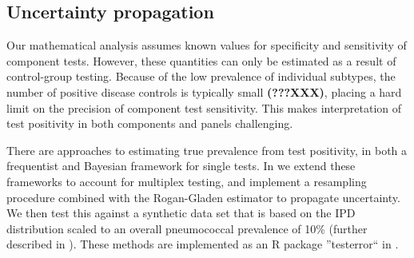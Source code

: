 \documentclass[10pt,letterpaper]{article}
\begin{document}
\subsection*{Uncertainty propagation}

Our mathematical analysis assumes known values for specificity and sensitivity of component tests. However, these quantities can only be estimated as a result of control-group testing. Because of the low prevalence of individual subtypes, the number of positive disease controls is typically small \cite{bonten2015} {\bf(???XXX)}, placing a hard limit on the precision of component test sensitivity. This makes interpretation of test positivity in both components and panels challenging.

There are approaches to estimating true prevalence from test positivity, in both a frequentist\cite{lang2014,thomas2022,flor2020} and Bayesian framework\cite{gelman2020,flor2020} for single tests. In  we extend these frameworks to account for multiplex testing, and implement a resampling procedure combined with the Rogan-Gladen estimator to propagate uncertainty. We then test this against a synthetic data set that is based on the IPD distribution scaled to an overall pneumococcal prevalence of 10\% (further described in ). These methods are implemented as an R package ''testerror`` in .

%
\end{document}
